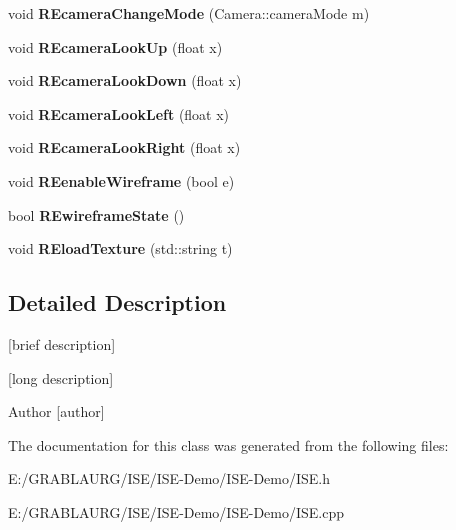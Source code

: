 \begin{DoxyCompactItemize}
\item 
\hypertarget{class_i_s_e_a6f575da4f156b4f781c074c914c0f916}{void {\bfseries R\-Ecamera\-Change\-Mode} (Camera\-::camera\-Mode m)}\label{class_i_s_e_a6f575da4f156b4f781c074c914c0f916}

\item 
\hypertarget{class_i_s_e_a24b550f263464fb9ac75d68b75e123ab}{void {\bfseries R\-Ecamera\-Look\-Up} (float x)}\label{class_i_s_e_a24b550f263464fb9ac75d68b75e123ab}

\item 
\hypertarget{class_i_s_e_ab7a40ee7f17546a2d00234b420870202}{void {\bfseries R\-Ecamera\-Look\-Down} (float x)}\label{class_i_s_e_ab7a40ee7f17546a2d00234b420870202}

\item 
\hypertarget{class_i_s_e_ae3eb6e3a02a12d3d1c7d3e786a3a5b69}{void {\bfseries R\-Ecamera\-Look\-Left} (float x)}\label{class_i_s_e_ae3eb6e3a02a12d3d1c7d3e786a3a5b69}

\item 
\hypertarget{class_i_s_e_a47278cfe9c73168f56596994418c24d0}{void {\bfseries R\-Ecamera\-Look\-Right} (float x)}\label{class_i_s_e_a47278cfe9c73168f56596994418c24d0}

\item 
\hypertarget{class_i_s_e_a07bb014636d0f75ea59303f8fd042db5}{void {\bfseries R\-Eenable\-Wireframe} (bool e)}\label{class_i_s_e_a07bb014636d0f75ea59303f8fd042db5}

\item 
\hypertarget{class_i_s_e_a80f5ce9c8eb7e7a9f5a40b5affd53f34}{bool {\bfseries R\-Ewireframe\-State} ()}\label{class_i_s_e_a80f5ce9c8eb7e7a9f5a40b5affd53f34}

\item 
\hypertarget{class_i_s_e_a08dbe2845f2abffaeb1645b205da8442}{void {\bfseries R\-Eload\-Texture} (std\-::string t)}\label{class_i_s_e_a08dbe2845f2abffaeb1645b205da8442}

\end{DoxyCompactItemize}


\subsection{Detailed Description}
\mbox{[}brief description\mbox{]} 

\mbox{[}long description\mbox{]} \begin{DoxyAuthor}{Author}
\mbox{[}author\mbox{]} 
\end{DoxyAuthor}


The documentation for this class was generated from the following files\-:\begin{DoxyCompactItemize}
\item 
E\-:/\-G\-R\-A\-B\-L\-A\-U\-R\-G/\-I\-S\-E/\-I\-S\-E-\/\-Demo/\-I\-S\-E-\/\-Demo/I\-S\-E.\-h\item 
E\-:/\-G\-R\-A\-B\-L\-A\-U\-R\-G/\-I\-S\-E/\-I\-S\-E-\/\-Demo/\-I\-S\-E-\/\-Demo/I\-S\-E.\-cpp\end{DoxyCompactItemize}
